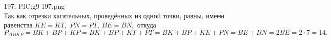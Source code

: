 197. {{PIC:g9-197.png}}\\
Так как отрезки касательных, проведённых из одной точки, равны, имеем равенства $KE=KT,$ $PN=PT,\ BE=BN,$ откуда $P_{\Delta BKP}=BK+BP+KP=BK+BP+KT+PT=
BK+BP+KE+PN=BE+BN=2BE=2\cdot7=14.$\newpage\noindent
